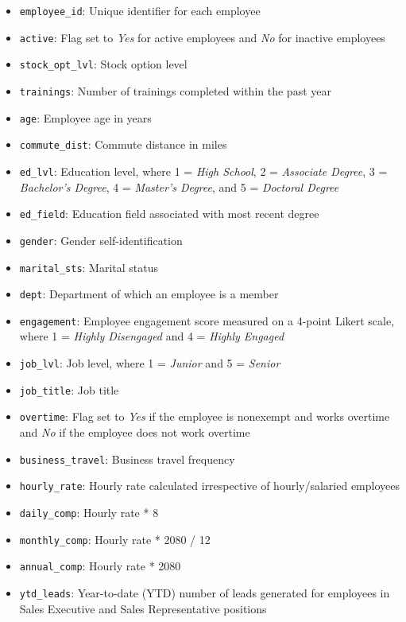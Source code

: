 \documentclass[
]{book}
\providecommand{\tightlist}{%
  \setlength{\itemsep}{0pt}\setlength{\parskip}{0pt}}
\begin{document}
\begin{itemize}
\tightlist
\item
  \texttt{employee\_id}: Unique identifier for each employee
\item
  \texttt{active}: Flag set to \emph{Yes} for active employees and \emph{No} for inactive employees
\item
  \texttt{stock\_opt\_lvl}: Stock option level
\item
  \texttt{trainings}: Number of trainings completed within the past year
\item
  \texttt{age}: Employee age in years
\item
  \texttt{commute\_dist}: Commute distance in miles
\item
  \texttt{ed\_lvl}: Education level, where 1 = \emph{High School}, 2 = \emph{Associate Degree}, 3 = \emph{Bachelor's Degree}, 4 = \emph{Master's Degree}, and 5 = \emph{Doctoral Degree}
\item
  \texttt{ed\_field}: Education field associated with most recent degree
\item
  \texttt{gender}: Gender self-identification
\item
  \texttt{marital\_sts}: Marital status
\item
  \texttt{dept}: Department of which an employee is a member
\item
  \texttt{engagement}: Employee engagement score measured on a 4-point Likert scale, where 1 = \emph{Highly Disengaged} and 4 = \emph{Highly Engaged}
\item
  \texttt{job\_lvl}: Job level, where 1 = \emph{Junior} and 5 = \emph{Senior}
\item
  \texttt{job\_title}: Job title
\item
  \texttt{overtime}: Flag set to \emph{Yes} if the employee is nonexempt and works overtime and \emph{No} if the employee does not work overtime
\item
  \texttt{business\_travel}: Business travel frequency
\item
  \texttt{hourly\_rate}: Hourly rate calculated irrespective of hourly/salaried employees
\item
  \texttt{daily\_comp}: Hourly rate * 8
\item
  \texttt{monthly\_comp}: Hourly rate * 2080 / 12
\item
  \texttt{annual\_comp}: Hourly rate * 2080
\item
  \texttt{ytd\_leads}: Year-to-date (YTD) number of leads generated for employees in Sales Executive and Sales Representative positions

\end{itemize}
\end{document}
